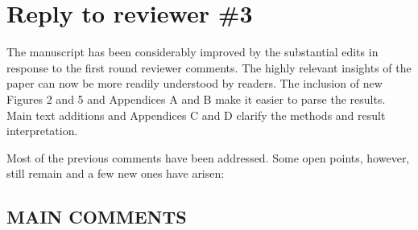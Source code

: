 \documentclass[
]{article}
\begin{document}
\section{Reply to reviewer \#3}

The manuscript has been considerably improved by the substantial edits in response to the first round reviewer comments. The highly relevant insights of the paper can now be more readily understood by readers. The inclusion of new Figures 2 and 5 and Appendices A and B make it easier to parse the results. Main text additions and Appendices C and D clarify the methods and result interpretation.

Most of the previous comments have been addressed. Some open points, however, still remain and a few new ones have arisen:

\subsection{MAIN COMMENTS}
\end{document}
